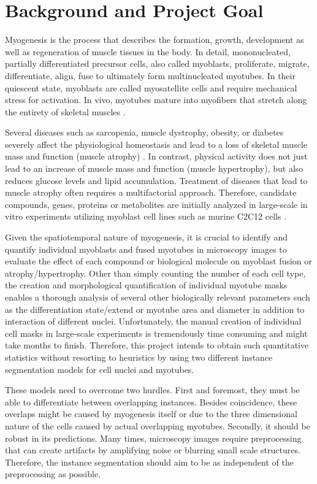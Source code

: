 \section{Background and Project Goal}
Myogenesis is the process that describes the formation, growth, development as well as regeneration of muscle tissues in the body. In detail, mononucleated, partially differentiated precursor cells, also called myoblasts, proliferate, migrate, differentiate, align, fuse to ultimately form multinucleated myotubes. In their quiescent state, myoblasts are called myosatellite cells and require mechanical stress for activation. In vivo, myotubes mature into myofibers that stretch along the entirety of skeletal muscles \cite{tajbakhsh2009, bentzinger, bollen}.

Several diseases such as sarcopenia, muscle dystrophy, obesity, or diabetes severely affect the physiological homeostasis and lead to a loss of skeletal muscle mass and function (muscle atrophy) \cite{argiles}. In contrast, physical activity does not just lead to an increase of muscle mass and function (muscle hypertrophy), but also reduces glucose levels and lipid accumulation. Treatment of diseases that lead to muscle atrophy often requires a multifactorial approach. Therefore, candidate compounds, genes, proteins or metabolites are initially analyzed in large-scale in vitro experiments utilizing myoblast cell lines such as murine C2C12 cells \cite{bajaj}.

Given the spatiotemporal nature of myogenesis, it is crucial to identify and quantify individual myoblasts and fused myotubes in microscopy images to evaluate the effect of each compound or biological molecule on myoblast fusion or atrophy/hypertrophy. Other than simply counting the number of each cell type, the creation and morphological quantification of individual myotube masks enables a thorough analysis of several other biologically relevant parameters such as the differentiation state/extend or myotube area and diameter in addition to interaction of different nuclei. Unfortunately, the manual creation of individual cell masks in large-scale experiments is tremendously time consuming and might take months to finish. Therefore, this project intends to obtain such quantitative statistics without resorting to heuristics by using two different instance segmentation models for cell nuclei and myotubes.

These models need to overcome two hurdles. First and foremost, they must be able to differentiate between overlapping instances. Besides coincidence, these overlaps might be caused by myogenesis itself or due to the three dimensional nature of the cells caused by actual overlapping myotubes. Secondly, it should be robust in its predictions. Many times, microscopy images require preprocessing that can create artifacts by amplifying noise or blurring small scale structures. Therefore, the instance segmentation should aim to be as independent of the preprocessing as possible.

